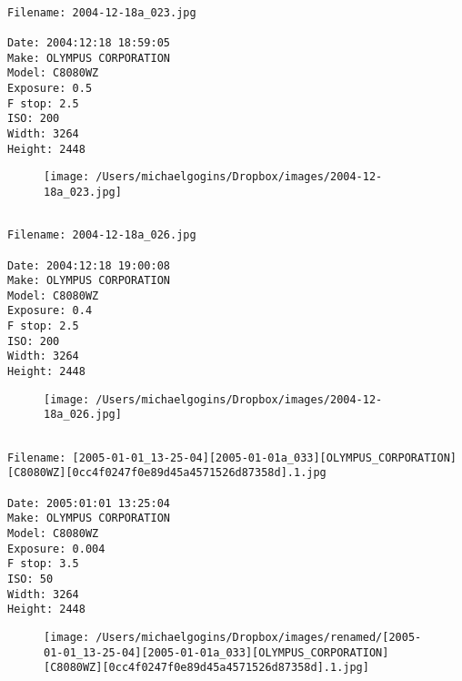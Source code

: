 \documentclass[11pt,letter,DIV=14,paper=landscape]{scrbook}
\begin{document}
\clearpage
\noindent 
\noindent
\begin{lstlisting}

Filename: 2004-12-18a_023.jpg

Date: 2004:12:18 18:59:05
Make: OLYMPUS CORPORATION
Model: C8080WZ
Exposure: 0.5
F stop: 2.5
ISO: 200
Width: 3264
Height: 2448
\end{lstlisting}
\clearpage

\begin{figure}
\texttt{[image: /Users/michaelgogins/Dropbox/images/2004-12-18a\_023.jpg]}
\end{figure}
    
\clearpage
\noindent 
\noindent
\begin{lstlisting}

Filename: 2004-12-18a_026.jpg

Date: 2004:12:18 19:00:08
Make: OLYMPUS CORPORATION
Model: C8080WZ
Exposure: 0.4
F stop: 2.5
ISO: 200
Width: 3264
Height: 2448
\end{lstlisting}
\clearpage

\begin{figure}
\texttt{[image: /Users/michaelgogins/Dropbox/images/2004-12-18a\_026.jpg]}
\end{figure}
    
\clearpage
\noindent 
\noindent
\begin{lstlisting}

Filename: [2005-01-01_13-25-04][2005-01-01a_033][OLYMPUS_CORPORATION][C8080WZ][0cc4f0247f0e89d45a4571526d87358d].1.jpg

Date: 2005:01:01 13:25:04
Make: OLYMPUS CORPORATION
Model: C8080WZ
Exposure: 0.004
F stop: 3.5
ISO: 50
Width: 3264
Height: 2448
\end{lstlisting}
\clearpage

\begin{figure}
\texttt{[image: /Users/michaelgogins/Dropbox/images/renamed/[2005-01-01\_13-25-04][2005-01-01a\_033][OLYMPUS\_CORPORATION][C8080WZ][0cc4f0247f0e89d45a4571526d87358d].1.jpg]}
\end{figure}
    
\end{document}
